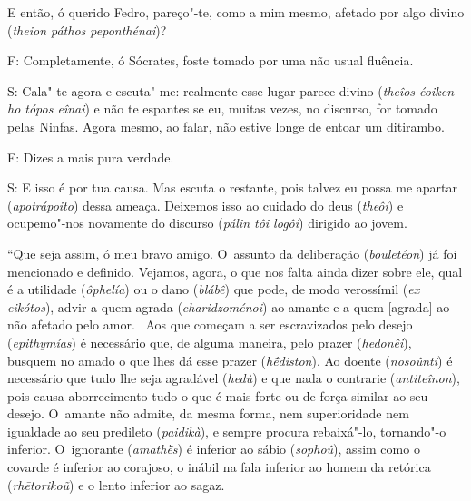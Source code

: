 E então, ó querido Fedro, pareço"-te, como a mim mesmo, afetado por algo
divino (\emph{theion páthos peponthénai})?

F: Completamente, ó Sócrates, foste tomado por uma não usual fluência.

S: Cala"-te agora e escuta"-me: realmente esse lugar parece divino
(\emph{theîos éoiken ho tópos eînai}) e não te espantes se eu, muitas
vezes, no discurso, for tomado pelas Ninfas. \bekker{[238d]} Agora mesmo, ao
falar, não estive longe de entoar um ditirambo.

F: Dizes a mais pura verdade.

S: E isso é por tua causa. Mas escuta o restante, pois talvez eu possa
me apartar (\emph{apotrápoito}) dessa ameaça. Deixemos isso ao cuidado
do deus (\emph{theôi}) e ocupemo"-nos novamente do discurso (\emph{pálin
tôi logôi}) dirigido ao jovem.

``Que seja assim, ó meu bravo amigo. O~assunto da deliberação
(\emph{bouletéon}) já foi mencionado e definido. Vejamos, agora, o que
nos falta ainda dizer sobre ele, qual é a utilidade (\emph{ôphelía}) ou
o dano (\emph{blábê}) que pode, de modo verossímil (\emph{ex eikótos}),
advir a quem agrada (\emph{charidzoménoi}) ao amante e a quem
[agrada] ao não afetado pelo amor.~\bekker{[238e]} Aos que começam a ser
escravizados pelo desejo (\emph{epithymías}) é necessário que, de alguma
maneira, pelo prazer (\emph{hedonêi}), busquem no amado o que lhes dá
esse prazer (\emph{hḗdiston}). Ao doente (\emph{nosoûnti}) é necessário
que tudo lhe seja agradável (\emph{hedù}) e que nada o contrarie
(\emph{antiteînon}), pois causa aborrecimento tudo o que é mais forte ou
de força similar ao seu desejo. O~amante não admite, da mesma forma, nem
superioridade nem igualdade ao seu predileto (\emph{paidikà}),
\bekker{[239a]} e sempre procura rebaixá"-lo, tornando"-o inferior. O~ignorante
(\emph{amathḕs}) é inferior ao sábio (\emph{sophoû}), assim como o
covarde é inferior ao corajoso, o inábil na fala inferior ao homem da
retórica (\emph{rhētorikoũ}) e o lento inferior ao sagaz.

